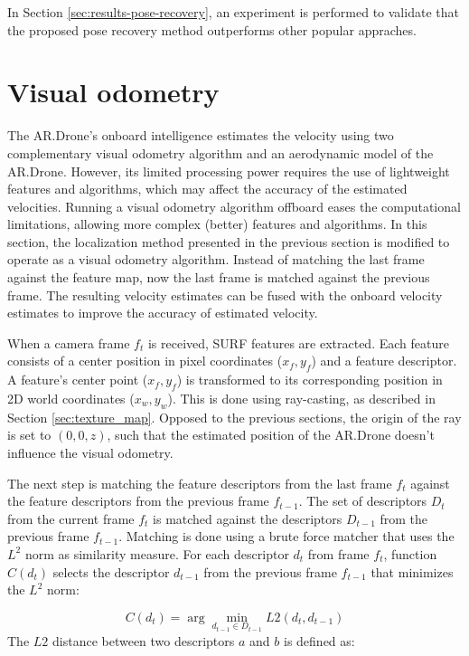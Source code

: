 In Section \ref{sec:results-pose-recovery}, an experiment is performed to validate that the proposed pose recovery method outperforms other popular appraches.



\section{Visual odometry}
\label{sec:visual-slam-visual-odemetry}
The AR.Drone's onboard intelligence estimates the velocity using two complementary visual odometry algorithm and an aerodynamic model of the AR.Drone.
However, its limited processing power requires the use of lightweight features and algorithms, which may affect the accuracy of the estimated velocities.
Running a visual odometry algorithm offboard eases the computational limitations, allowing more complex (better) features and algorithms.
In this section, the localization method presented in the previous section is modified to operate as a visual odometry algorithm.
Instead of matching the last frame against the feature map, now the last frame is matched against the previous frame.
The resulting velocity estimates can be fused with the onboard velocity estimates to improve the accuracy of estimated velocity.

When a camera frame $f_t$ is received, SURF features are extracted.
Each feature consists of a center position in pixel coordinates ($x_f, y_f$) and a feature descriptor.
A feature's center point ($x_f, y_f$) is transformed to its corresponding position in 2D world coordinates ($x_w, y_w$).
This is done using ray-casting, as described in Section \ref{sec:texture_map}.
Opposed to the previous sections, the origin of the ray is set to $(0, 0, z)$, such that the estimated position of the AR.Drone doesn't influence the visual odometry.

The next step is matching the feature descriptors from the last frame $f_t$ against the feature descriptors from the previous frame $f_{t-1}$.
The set of descriptors $D_{t}$ from the current frame $f_t$ is matched against the descriptors $D_{t-1}$ from the previous frame $f_{t-1}$.
Matching is done using a brute force matcher that uses the $L^2$ norm as similarity measure.
For each descriptor $d_{t}$ from frame $f_t$, function $C(d_{t})$ selects the descriptor $d_{t-1}$ from the previous frame $f_{t-1}$ that minimizes the $L^2$ norm:

\begin{equation}
C(d_{t}) = \arg\min_{d_{t-1} \in D_{t-1}} L2(d_t, d_{t-1})
\end{equation}
The $L2$ distance between two descriptors $a$ and $b$ is defined as:

